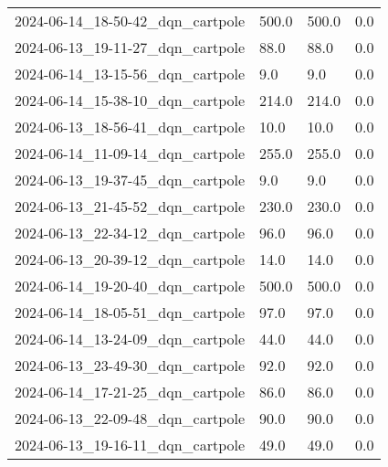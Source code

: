 \documentclass[a4paper,12pt]{article}
\begin{document}
\begin{center}
{\begin{tabular}{llll}
            2024-06-14\_18-50-42\_dqn\_cartpole & 500.0                 & 500.0                   & 0.0                    \\
            2024-06-13\_19-11-27\_dqn\_cartpole & 88.0                  & 88.0                    & 0.0                    \\
            2024-06-14\_13-15-56\_dqn\_cartpole & 9.0                   & 9.0                     & 0.0                    \\
            2024-06-14\_15-38-10\_dqn\_cartpole & 214.0                 & 214.0                   & 0.0                    \\
            2024-06-13\_18-56-41\_dqn\_cartpole & 10.0                  & 10.0                    & 0.0                    \\
            2024-06-14\_11-09-14\_dqn\_cartpole & 255.0                 & 255.0                   & 0.0                    \\
            2024-06-13\_19-37-45\_dqn\_cartpole & 9.0                   & 9.0                     & 0.0                    \\
            2024-06-13\_21-45-52\_dqn\_cartpole & 230.0                 & 230.0                   & 0.0                    \\
            2024-06-13\_22-34-12\_dqn\_cartpole & 96.0                  & 96.0                    & 0.0                    \\
            2024-06-13\_20-39-12\_dqn\_cartpole & 14.0                  & 14.0                    & 0.0                    \\
            2024-06-14\_19-20-40\_dqn\_cartpole & 500.0                 & 500.0                   & 0.0                    \\
            2024-06-14\_18-05-51\_dqn\_cartpole & 97.0                  & 97.0                    & 0.0                    \\
            2024-06-14\_13-24-09\_dqn\_cartpole & 44.0                  & 44.0                    & 0.0                    \\
            2024-06-13\_23-49-30\_dqn\_cartpole & 92.0                  & 92.0                    & 0.0                    \\
            2024-06-14\_17-21-25\_dqn\_cartpole & 86.0                  & 86.0                    & 0.0                    \\
            2024-06-13\_22-09-48\_dqn\_cartpole & 90.0                  & 90.0                    & 0.0                    \\
            2024-06-13\_19-16-11\_dqn\_cartpole & 49.0                  & 49.0                    & 0.0                    \\
        \end{tabular}
    }
\end{center}
\end{document}
